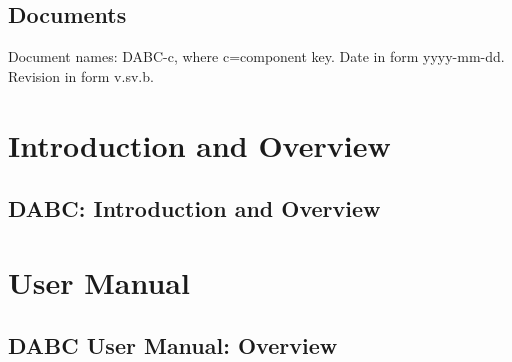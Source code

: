 \documentclass{dabcclass}
\begin{document}
 \cleardoublepage
\thispagestyle{empty} \tableofcontents \thispagestyle{empty} \cleardoublepage
{}

 \cleardoublepage
 \cleardoublepage
 \cleardoublepage
 \cleardoublepage
 \cleardoublepage

\setcounter{chapter}{0}
\chapter{Documents}
Document names: DABC-c, where c=component key. Date in form yyyy-mm-dd.
Revision in form v.sv.b.\\

%



%
%

%
%
\cleardoublepage
\part{Introduction and Overview}
\chapter{DABC: Introduction and Overview}
 \cleardoublepage
\part{User Manual}
\chapter{DABC User Manual: Overview}
 \cleardoublepage
\end{document}
